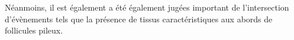 


Néanmoins, il est également a été également jugées important de l'intersection d'évènements tels que la présence de tissus caractéristiques aux abords de follicules pileux.\par